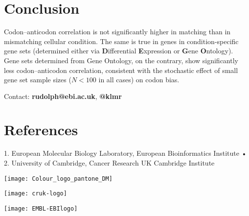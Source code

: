 \documentclass[a0,portrait]{a0poster}
\begin{document}
\section*{Conclusion}
{
    \LARGE
    Codon--anticodon correlation is not significantly higher in matching
    than in mismatching cellular condition. The same is true in genes in
    condition-specific gene sets (determined either via \textbf Differential
    \textbf Expression or \textbf Gene \textbf Ontology). Gene sets determined from Gene Ontology,
    on the contrary, show significantly less codon--anticodon correlation,
    consistent with the stochastic effect of small gene set sample sizes
    (\(N<100\) in all cases) on codon bias.

    \hfill Contact: \textbf{rudolph@ebi.ac.uk}, \textbf{@klmr}
}

\vspace{-1cm}
\section*{References}
\vspace{-1.5cm}
\begin{multicols}{2}
    \renewcommand\section[2]{}
    
\end{multicols}

\vfill
\noindent
\begin{center}
\normalsize%
1. European Molecular Biology Laboratory, European Bioinformatics Institute •
2. University of Cambridge, Cancer Research UK Cambridge Institute
\end{center}
\vspace{1cm}

\noindent
\begin{minipage}[][][b]{0.3\textwidth}
    \centering
    \texttt{[image: Colour\_logo\_pantone\_DM]}
\end{minipage}%
\hfill%
\begin{minipage}[][][b]{0.3\textwidth}
    \centering
    \texttt{[image: cruk-logo]}
\end{minipage}%
\hfill%
\begin{minipage}[][][b]{0.3\textwidth}
    \centering
    \texttt{[image: EMBL-EBIlogo]}
\end{minipage}%
\end{document}
